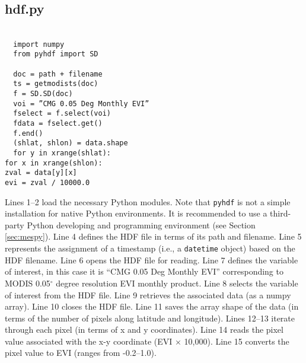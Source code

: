 \subsection{hdf.py}
\label{app:hdfpy}
\texttt{ \\
~~import numpy\\
~~from pyhdf import SD\\
~~\\
~~doc = path + filename\\
~~ts = get\textunderscore modis\textunderscore ts(doc)\\
~~f = SD.SD(doc)\\
~~voi = ''CMG 0.05 Deg Monthly EVI''\\
~~f\textunderscore select = f.select(voi)\\
~~f\textunderscore data = f\textunderscore select.get()\\
~~f.end()\\
~~(sh\textunderscore lat, sh\textunderscore lon) = data.shape\\
~~for y in xrange(sh\textunderscore lat):\\
 \indent for x in xrange(sh\textunderscore lon):\\
 \indent \indent zval = data[y][x]\\
 \indent \indent evi = zval / 10000.0\\
}

Lines 1--2 load the necessary Python modules.  
Note that \texttt{pyhdf} is not a simple installation for native Python environments.  
It is recommended to use a third-party Python developing and programming environment (see Section \ref{sec:mespy}). 
Line 4 defines the HDF file in terms of its path and filename.  
Line 5 represents the assignment of a timestamp (i.e., a \texttt{datetime} object) based on the HDF filename.  
Line 6 opens the HDF file for reading.  
Line 7 defines the variable of interest, in this case it is ``CMG 0.05 Deg Monthly EVI'' corresponding to MODIS 0.05$^{\circ}$ degree resolution EVI monthly product.  
Line 8 selects the variable of interest from the HDF file.  
Line 9 retrieves the associated data (as a numpy array).  
Line 10 closes the HDF file.  
Line 11 saves the array shape of the data (in terms of the number of pixels along latitude and longitude). 
Lines 12--13 iterate through each pixel (in terms of x and y coordinates).  
Line 14 reads the pixel value associated with the x-y coordinate (EVI $\times$ 10,000).  
Line 15 converts the pixel value to EVI (ranges from -0.2--1.0).

